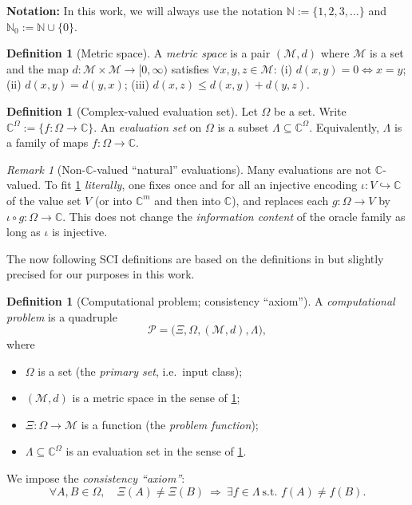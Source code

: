 \documentclass{lmcs} %
\theoremstyle{plain}
\theoremstyle{plain}
\theoremstyle{definition}
\newtheorem{definition}[theorem]{Definition}
\theoremstyle{remark}
\newtheorem{remark}[theorem]{Remark}
\theoremstyle{definition}
\theoremstyle{remark}
\numberwithin{equation}{section}
\newcommand{\NN}{\mathbb{N}}
\newcommand{\C}{\mathbb{C}}
\begin{document}
\textbf{Notation:} In this work, we will always use the notation $\NN := \{1,2,3,\dots\}$ and $\NN_0:=\NN \cup \{0\}$.

\begin{definition}[Metric space]\label{def:metric}
A \textit{metric space} is a pair $(\mathcal{M},d)$ where $\mathcal{M}$ is a set and the map
$d:\mathcal{M}\times\mathcal{M}\to [0,\infty)$ satisfies $\forall x,y,z \in \mathcal{M}$:
(i) $d(x,y)=0 \Leftrightarrow x=y$;
(ii) $d(x,y)=d(y,x)$;
(iii) $d(x,z)\le d(x,y)+d(y,z)$.
\end{definition}

\begin{definition}[Complex-valued evaluation set]\label{def:eval-set}
Let $\Omega$ be a set. Write $\C^\Omega:=\{f:\Omega\to\C\}$.
An \textit{evaluation set} on $\Omega$ is a subset $\Lambda\subseteq \C^\Omega$.
Equivalently, $\Lambda$ is a family of maps $f:\Omega\to\C$.
\end{definition}

\begin{remark}[Non-$\C$-valued \enquote{natural} evaluations]\label{rem:nonC}
Many evaluations are not $\C$-valued.
To fit \cref{def:eval-set} \textit{literally}, one fixes once and for all an injective encoding
$\iota:V\hookrightarrow \C$ of the value set $V$ (or into $\C^m$ and then into $\C$),
and replaces each $g:\Omega\to V$ by $\iota\circ g:\Omega\to\C$.
This does not change the \textit{information content} of the oracle family as long as $\iota$ is injective.
\end{remark}

The now following SCI definitions are based on the definitions in \cite[Appendix~A]{colbrook2024limits} but slightly precised for our purposes in this work.

\begin{definition}[Computational problem; consistency \enquote{axiom}]\label{def:comp-prob}
A \textit{computational problem} is a quadruple
\[
  \mathcal{P}=\bigl( \Xi,\Omega,(\mathcal{M},d),\Lambda \bigr),
\]
where
\begin{itemize}
\item $\Omega$ is a set (the \textit{primary set}, i.e.\ input class);
\item $(\mathcal{M},d)$ is a metric space in the sense of \cref{def:metric};
\item $\Xi:\Omega\to\mathcal{M}$ is a function (the \textit{problem function});
\item $\Lambda\subseteq \C^\Omega$ is an evaluation set in the sense of \cref{def:eval-set}.
\end{itemize}
We impose the \textit{consistency \enquote{axiom}}:
\begin{equation}\label{eq:consistency}
\forall A,B\in\Omega,\quad \Xi(A)\neq \Xi(B)\ \Longrightarrow\ \exists f\in\Lambda\ \text{s.t. } f(A)\neq f(B).
\end{equation}
\end{definition}
\end{document}
